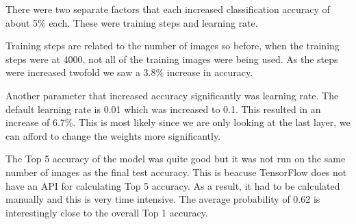There were two separate factors that each increased classification accuracy of
about 5\% each. These were training steps and learning rate.

Training steps are related to the number of images so before, when the training
steps were at 4000, not all of the training images were being used. As the steps were increased
twofold we saw a 3.8\% increase in accuracy.

Another parameter that increased accuracy significantly was learning rate. The
default learning rate is 0.01 which was increased to 0.1. This resulted in an
increase of 6.7\%. This is most likely since we are only
looking at the last layer, we can afford to change the weights more
significantly.

The Top 5 accuracy of the model was quite good but it was not run on the same number of images as the final test accuracy. This is beacuse TensorFlow does not have an API for calculating Top 5 accuracy. As a result, it had to be calculated manually and this is very time intensive. The average probability of 0.62 is interestingly close to the overall Top 1 accuracy.
